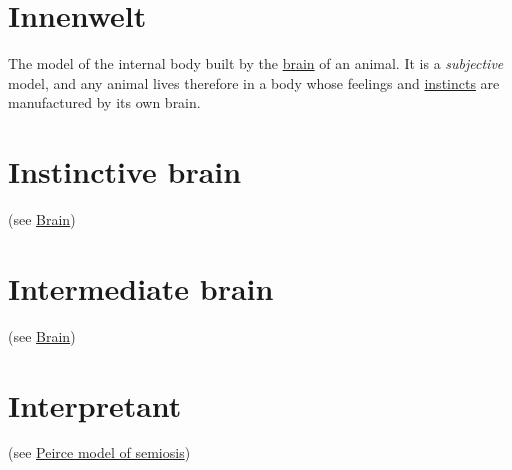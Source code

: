 \documentclass[12pt]{article}
\begin{document}
\hypertarget{innenwelt}{}
\section{Innenwelt}
The model of the internal body built by the \hyperlink{brain}{brain} of an animal. It is a \textit{subjective} model, and any animal lives therefore in a body whose feelings and \hyperlink{instinctive_brain}{instincts} are manufactured by its own brain.


\hypertarget{instinctive_brain}{}
\section{Instinctive brain} (see \hyperlink{brain}{Brain})


\hypertarget{intermediate_brain}{}
\section{Intermediate brain} (see \hyperlink{brain}{Brain})


\hypertarget{interpretant}{}
\section{Interpretant} 

(see \hyperlink{peirce_model_of_semiosis}{Peirce model of semiosis})


\hypertarget{interpretation}{}
\end{document}

